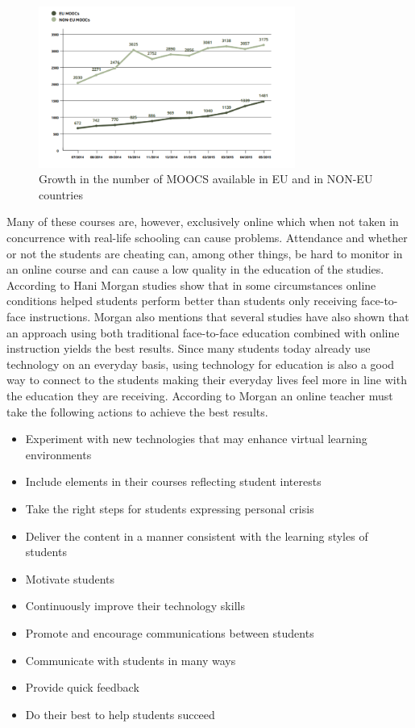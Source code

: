 \begin{figure}[H]
\centering
    \includegraphics[width=0.75\textwidth]{figures/MOOCS.PNG}
    \caption{Growth in the number of MOOCS available in EU and in NON-EU countries \cite{Warming2016MOOCsPERSPEKTIVER}}
    \label{fig:MOOCS}
\end{figure}

\noindent
Many of these courses are, however, exclusively online which when not taken in concurrence with real-life schooling can cause problems. Attendance and whether or not the students are cheating can, among other things, be hard to monitor in an online course and can cause a low quality in the education of the studies. According to Hani Morgan\cite{Morgan2015ThePupils} studies show that in some circumstances online conditions helped students perform better than students only receiving face-to-face instructions. Morgan also mentions that several studies have also shown that an approach using both traditional face-to-face education combined with online instruction yields the best results. Since many students today already use technology on an everyday basis, using technology for education is also a good way to connect to the students making their everyday lives feel more in line with the education they are receiving. According to Morgan an online teacher must take the following actions to achieve the best results.

\begin{itemize}
\item Experiment with new technologies that may enhance virtual learning environments
\item Include elements in their courses reflecting student interests
\item Take the right steps for students expressing personal crisis
\item Deliver the content in a manner consistent with the learning styles of students
\item Motivate students
\item Continuously improve their technology skills
\item Promote and encourage communications between students
\item Communicate with students in many ways
\item Provide quick feedback
\item Do their best to help students succeed
\end{itemize}